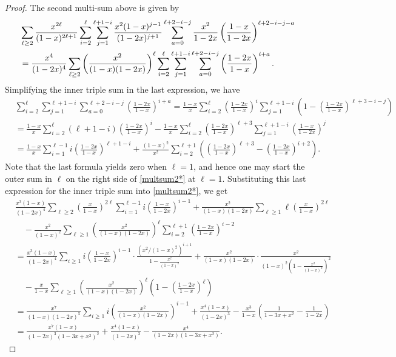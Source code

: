 \documentclass[10pt,a4paper]{amsart}
\begin{document}
\begin{proof}
The second multi-sum above is given by
\begin{align}
&\sum_{\ell \geq2}\frac{x^{2\ell}}{(1-x)^{2\ell+1}}\sum_{i=2}^\ell\sum_{j=1}^{\ell+1-i}\frac{x^2(1-x)^{j-1}}{(1-2x)^{j+1}}\sum_{a=0}^{\ell+2-i-j}\frac{x^2}{1-2x}\left(\frac{1-x}{1-2x}\right)^{\ell+2-i-j-a}\notag\\
&=\frac{x^4}{(1-2x)^4}\sum_{\ell \geq2}\left(\frac{x^2}{(1-x)(1-2x)}\right)^\ell\sum_{i=2}^\ell\sum_{j=1}^{\ell+1-i}\sum_{a=0}^{\ell+2-i-j}\left(\frac{1-2x}{1-x}\right)^{i+a}.\label{multsum2*}
\end{align}
Simplifying the inner triple sum in the last expression, we have
\begin{align*}
&\sum_{i=2}^\ell\sum_{j=1}^{\ell+1-i}\sum_{a=0}^{\ell+2-i-j}\left(\frac{1-2x}{1-x}\right)^{i+a}=\frac{1-x}{x}\sum_{i=2}^\ell\left(\frac{1-2x}{1-x}\right)^i\sum_{j=1}^{\ell+1-i}\left(1-\left(\frac{1-2x}{1-x}\right)^{\ell+3-i-j}\right)\\
&=\frac{1-x}{x}\sum_{i=2}^{\ell}(\ell+1-i)\left(\frac{1-2x}{1-x}\right)^i-\frac{1-x}{x}\sum_{i=2}^\ell\left(\frac{1-2x}{1-x}\right)^{\ell+3}\sum_{j=1}^{\ell+1-i}\left(\frac{1-x}{1-2x}\right)^j\\
&=\frac{1-x}{x}\sum_{i=1}^{\ell-1}i\left(\frac{1-2x}{1-x}\right)^{\ell+1-i}+\frac{(1-x)^2}{x^2}\sum_{i=2}^{\ell+1}\left(\left(\frac{1-2x}{1-x}\right)^{\ell+3}-\left(\frac{1-2x}{1-x}\right)^{i+2}\right).
\end{align*}
Note that the last formula yields zero when $\ell=1$, and hence one may start the outer sum in $\ell$ on the right side of \eqref{multsum2*} at $\ell=1$.  Substituting this last expression for the inner triple sum into \eqref{multsum2*}, we get
\begin{align*}
&\frac{x^3(1-x)}{(1-2x)^4}\sum_{\ell \geq2}\left(\frac{x}{1-x}\right)^{2\ell}\sum_{i=1}^{\ell-1}i\left(\frac{1-x}{1-2x}\right)^{i-1}+\frac{x^2}{(1-x)(1-2x)}\sum_{\ell\geq1}\ell\left(\frac{x}{1-x}\right)^{2\ell}\\
&\quad-\frac{x^2}{(1-x)^2}\sum_{\ell\geq1}\left(\frac{x^2}{(1-x)(1-2x)}\right)^\ell\sum_{i=2}^{\ell+1}\left(\frac{1-2x}{1-x}\right)^{i-2}\\
&=\frac{x^3(1-x)}{(1-2x)^4}\sum_{i\geq1}i\left(\frac{1-x}{1-2x}\right)^{i-1}\cdot\frac{(x^2/(1-x)^2)^{i+1}}{1-\frac{x^2}{(1-x)^2}}+\frac{x^2}{(1-x)(1-2x)}\cdot\frac{x^2}{(1-x)^2\left(1-\frac{x^2}{(1-x)^2}\right)^2}\\
&\quad-\frac{x}{1-x}\sum_{\ell \geq1}\left(\frac{x^2}{(1-x)(1-2x)}\right)^\ell\left(1-\left(\frac{1-2x}{1-x}\right)^\ell\right)\\
&=\frac{x^7}{(1-x)(1-2x)^5}\sum_{i\geq1}i\left(\frac{x^2}{(1-x)(1-2x)}\right)^{i-1}+\frac{x^4(1-x)}{(1-2x)^3}-\frac{x^3}{1-x}\left(\frac{1}{1-3x+x^2}-\frac{1}{1-2x}\right)\\
&=\frac{x^7(1-x)}{(1-2x)^3(1-3x+x^2)^2}+\frac{x^4(1-x)}{(1-2x)^3}-\frac{x^4}{(1-2x)(1-3x+x^2)}.
\end{align*}


\end{proof}
\end{document}
